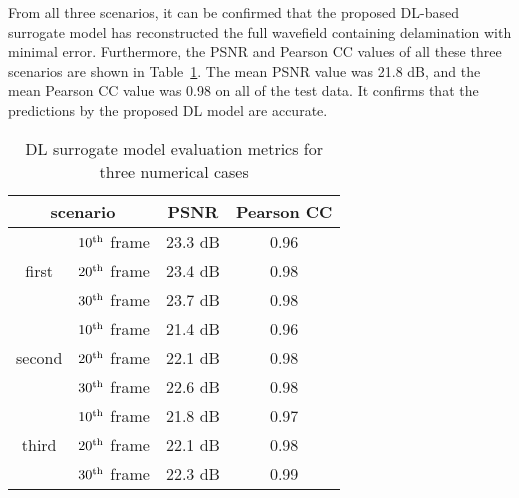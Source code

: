 From all three scenarios, it can be confirmed that the proposed DL-based surrogate model has reconstructed the full wavefield containing delamination with minimal error. 
Furthermore, the PSNR and Pearson CC values of all these three scenarios are shown in Table~\ref{tab:psnr_pearson}. 
The mean PSNR value was 21.8 dB, and the mean Pearson CC value was 0.98 on all of the test data.
It confirms that the predictions by the proposed DL model are accurate.
\begin{table}[ht]
	\centering
	\caption{DL surrogate model evaluation metrics for three numerical cases}
	\begin{tabular}{@{}cccc@{}}
		\toprule
		\multicolumn{2}{c}{scenario}                            & PSNR    & Pearson CC \\ 
		\midrule
		\multirow{3}{*}{first} & $10\textsuperscript{th}$ frame & 23.3 dB & 0.96       \\ 
		& $20\textsuperscript{th}$ frame                        & 23.4 dB & 0.98       \\ 
		& $30\textsuperscript{th}$ frame                        & 23.7 dB & 0.98       \\ 
		\midrule
		\multirow{3}{*}{second}& $10\textsuperscript{th}$ frame & 21.4 dB & 0.96       \\ 
		& $20\textsuperscript{th}$ frame                        & 22.1 dB & 0.98       \\ 
		& $30\textsuperscript{th}$ frame                        & 22.6 dB & 0.98       \\ 
		\midrule
		\multirow{3}{*}{third}& $10\textsuperscript{th}$ frame  & 21.8 dB & 0.97       \\ 
		& $20\textsuperscript{th}$ frame                        & 22.1 dB & 0.98       \\ 
		& $30\textsuperscript{th}$ frame                        & 22.3 dB & 0.99       \\ 
		\bottomrule
	\end{tabular}
	\label{tab:psnr_pearson}
\end{table}

